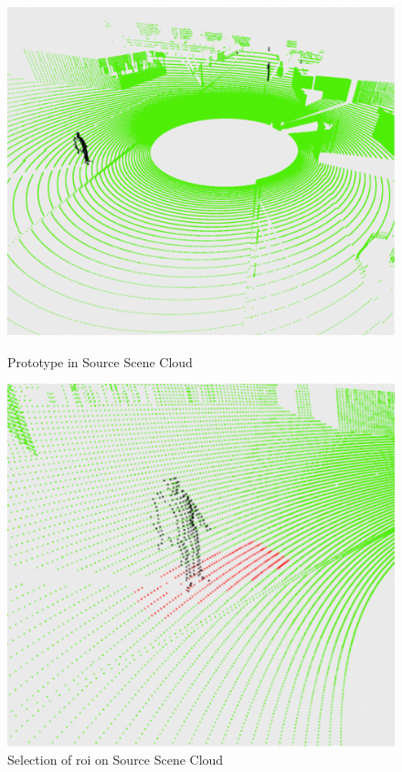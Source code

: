 \begin{figure}[htbp]
    \centering
    \begin{minipage}[b]{0.45\textwidth}
    \centering
    \includegraphics[width=1\linewidth]{97_graphics/results/prototype_on_source_scene_cloud.pdf}
    \caption{Prototype in Source Scene Cloud}
    \label{fig:result-prototype_on_source_scene}
    \end{minipage}
    \hfill
    \begin{minipage}[b]{0.45\textwidth}
    \centering
    \includegraphics[width=1\linewidth]{97_graphics/results/roi_select_source_scene_cloud.pdf}
    \caption{Selection of \acrshort{roi} on Source Scene Cloud}
    \label{fig:result-roi_select_source_scene}
    \end{minipage}
\end{figure}


